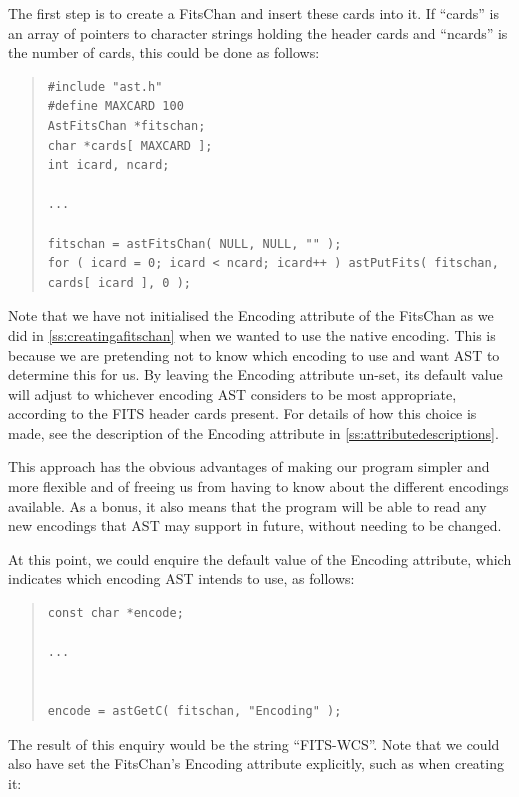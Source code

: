 \documentclass[twoside,11pt]{article}
\newcommand{\htmlref}[2]{#1}
\newcommand{\appref}[1]{Appendix~\ref{#1}}
\newcommand{\secref}[1]{\S\ref{#1}}
\renewcommand{\appref}[1]{\ref{#1}}
\renewcommand{\secref}[1]{\ref{#1}}
\begin{document}
The first step is to create a \htmlref{FitsChan}{FitsChan} and insert these cards into
it. If ``cards'' is an array of pointers to character strings holding
the header cards and ``ncards'' is the number of cards, this could be
done as follows:

\begin{quote}
\small
\begin{verbatim}
#include "ast.h"
#define MAXCARD 100
AstFitsChan *fitschan;
char *cards[ MAXCARD ];
int icard, ncard;

...

fitschan = astFitsChan( NULL, NULL, "" );
for ( icard = 0; icard < ncard; icard++ ) astPutFits( fitschan, cards[ icard ], 0 );
\end{verbatim}
\normalsize
\end{quote}

Note that we have not initialised the \htmlref{Encoding}{Encoding} attribute of the
FitsChan as we did in \secref{ss:creatingafitschan} when we wanted to
use the native encoding. This is because we are pretending not to know
which encoding to use and want AST to determine this for us. By
leaving the Encoding attribute un-set, its default value will adjust
to whichever encoding AST considers to be most appropriate, according
to the FITS header cards present. For details of how this choice is
made, see the description of the Encoding attribute in
\appref{ss:attributedescriptions}.

This approach has the obvious advantages of making our program simpler
and more flexible and of freeing us from having to know about the
different encodings available. As a bonus, it also means that the
program will be able to read any new encodings that AST may support in
future, without needing to be changed.

At this point, we could enquire the default value of the Encoding
attribute, which indicates which encoding AST intends to use, as
follows:

\begin{quote}
\small
\begin{verbatim}
const char *encode;

...


encode = astGetC( fitschan, "Encoding" );
\end{verbatim}
\normalsize
\end{quote}

The result of this enquiry would be the string ``FITS-WCS''.  Note
that we could also have set the FitsChan's Encoding attribute
explicitly, such as when creating it:
\end{document}
